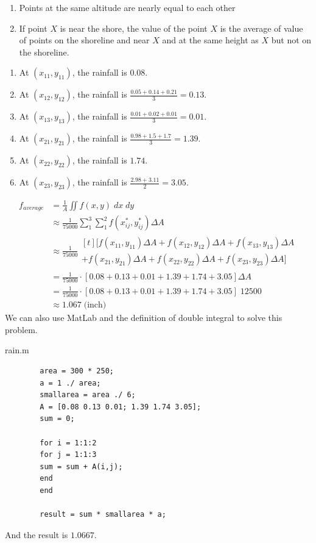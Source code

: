 \documentclass[a4paper]{article}
\begin{document}
	\begin{enumerate}[label=$\cdot$]
		\item Points at the same altitude are nearly equal to each other
		\item If point $X$ is near the shore, the value of the point $X$ is the average of value of points on the shoreline and near $X$ and at the same height as $X$ but not on the shoreline.
	\end{enumerate}
	\begin{enumerate}[label=$\bullet$]
		\item At $(x_{11}, y_{11})$, the rainfall is $0.08$.
		\item At $(x_{12}, y_{12})$, the rainfall is $\frac{0.05+0.14+0.21}{3}=0.13$.
		\item At $(x_{13}, y_{13})$, the rainfall is $\frac{0.01+0.02+0.01}{3}=0.01$.
		\item At $(x_{21}, y_{21})$, the rainfall is $\frac{0.98+1.5+1.7}{3}=1.39$.
		\item At $(x_{22}, y_{22})$, the rainfall is $1.74$.
		\item At $(x_{23}, y_{23})$, the rainfall is $\frac{2.98+3.11}{2}=3.05$.
	\end{enumerate}
	\begin{align*}
	f_{average} & = \frac{1}{A}\iint f(x,y)\;dx\;dy \\
	& \approx \frac{1}{75000} \sum_{1}^{3} \sum_{1}^{2} f(x_{ij}^{*}, y_{ij}^{*}) \Delta A \\
	& \approx \frac{1}{75000} \begin{multlined}[t]
	\bigl[f(x_{11}, y_{11}) \Delta A + f(x_{12}, y_{12}) \Delta A + f(x_{13}, y_{13}) \Delta A \\
	+ f(x_{21}, y_{21}) \Delta A + f(x_{22}, y_{22}) \Delta A + f(x_{23}, y_{23}) \Delta A\bigr]
	\end{multlined} \\
	& = \frac{1}{75000} \cdot [0.08 + 0.13 + 0.01 + 1.39 + 1.74 + 3.05] \Delta A \\
	& = \frac{1}{75000} \cdot [0.08 + 0.13 + 0.01 + 1.39 + 1.74 + 3.05]\; 12500 \\
	& \approx 1.067\;\text{(inch)}
	\end{align*}
	We can also use MatLab and the definition of double integral to solve this problem.
	\begin{mdframed}[hidealllines=true,backgroundcolor=magenta!10]
		rain.m
		\begin{lstlisting}
		area = 300 * 250;
		a = 1 ./ area;
		smallarea = area ./ 6;
		A = [0.08 0.13 0.01; 1.39 1.74 3.05];
		sum = 0;
		
		for i = 1:1:2
		for j = 1:1:3
		sum = sum + A(i,j);
		end
		end
		
		result = sum * smallarea * a;
		\end{lstlisting}
	\end{mdframed}
	And the result is $1.0667$.
	
\end{document}
